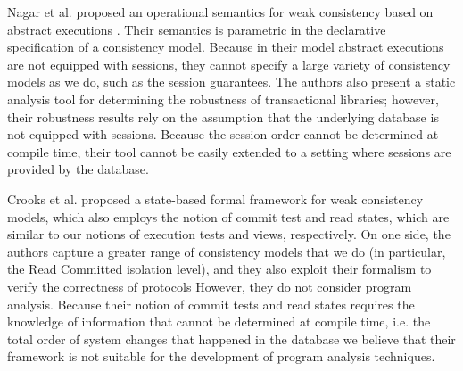 Nagar et al. proposed an operational semantics for weak consistency 
based on abstract executions \cite{sureshConcur}. Their semantics 
is parametric in the declarative specification of a consistency model. Because 
in their model abstract executions are not equipped with sessions, they cannot 
specify a large variety of consistency models as we do, such as the session guarantees. 
The authors also present a static analysis tool for determining the robustness of transactional 
libraries; however, their robustness results rely on the assumption that the underlying database 
is not equipped with sessions. Because the session order cannot be determined at compile time, 
their tool cannot be easily extended to a setting where sessions are provided by the database. 


Crooks et al. proposed a state-based formal framework for weak consistency models, 
which also employs the notion of commit test and read states, which are similar 
to our notions of execution tests and views, respectively. On one side, the authors capture 
a greater range of consistency models that we do (in particular, the Read Committed isolation level), 
and they also exploit their formalism to verify the correctness of protocols
However, they do not consider program analysis. Because their notion of commit tests and read states requires 
the knowledge of information that cannot be determined at compile time, i.e. the total order of system changes that happened in the database 
we believe that their framework is not suitable for the development of program analysis techniques.

